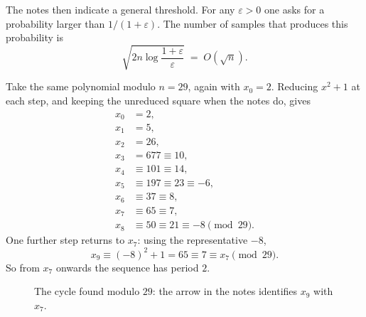 The notes then indicate a general threshold. For any $\varepsilon>0$ one asks for a probability larger than $1/(1+\varepsilon)$. The number of samples that produces this probability is
\begin{equation}
    \sqrt{2n\log\frac{1+\varepsilon}{\varepsilon}} \;=\; O(\sqrt{n}).
    \label{eq:birthday-eps}
\end{equation}


\begin{example}
Take the same polynomial modulo $n=29$, again with $x_0=2$. Reducing $x^2+1$ at each step, and keeping the unreduced square when the notes do, gives
\begin{align*}
    x_0 &= 2,\\
    x_1 &= 5,\\
    x_2 &= 26,\\
    x_3 &= 677 \equiv 10,\\
    x_4 &\equiv 101 \equiv 14,\\
    x_5 &\equiv 197 \equiv 23 \equiv -6,\\
    x_6 &\equiv 37 \equiv 8,\\
    x_7 &\equiv 65 \equiv 7,\\
    x_8 &\equiv 50 \equiv 21 \equiv -8 \pmod{29}.
\end{align*}
One further step returns to $x_7$: using the representative $-8$,
\[
    x_9 \equiv (-8)^2+1 = 65 \equiv 7 \equiv x_7 \pmod{29}.
\]
So from $x_7$ onwards the sequence has period $2$.
\end{example}

\begin{figure}[H]
\centering
{}
\caption{The cycle found modulo $29$: the arrow in the notes identifies $x_9$ with $x_7$.}
\end{figure}

